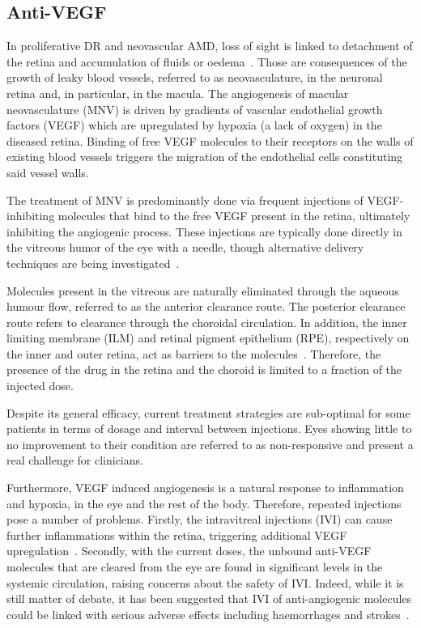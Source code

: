 \documentclass{article}
\begin{document}
\subsection*{Anti-VEGF}

In proliferative DR and neovascular AMD, loss of sight is linked to detachment of the retina and accumulation of fluids or oedema~\cite{Roberts_2020, Waldstein_2016}.
Those are consequences of the growth of leaky blood vessels, referred to as neovasculature, in the neuronal retina and, in particular, in the macula.
The angiogenesis of macular neovasculature (MNV) is driven by gradients of vascular endothelial growth factors (VEGF) which are upregulated by hypoxia (a lack of oxygen) in the diseased retina.
Binding of free VEGF molecules to their receptors on the walls of existing blood vessels triggers the migration of the endothelial cells constituting said vessel walls.

The treatment of MNV is predominantly done via frequent injections of VEGF-inhibiting molecules that bind to the free VEGF present in the retina, ultimately inhibiting the angiogenic process.
These injections are typically done directly in the vitreous humor of the eye with a needle, though alternative delivery techniques are being investigated~\cite{Kim_2021}.

Molecules present in the vitreous are naturally eliminated through the aqueous humour flow, referred to as the anterior clearance route.
The posterior clearance route refers to clearance through the choroidal circulation.
In addition, the inner limiting membrane (ILM) and retinal pigment epithelium (RPE), respectively on the inner and outer retina, act as barriers to the molecules~\cite{Park_2015}.
Therefore, the presence of the drug in the retina and the choroid is limited to a fraction of the injected dose. 

Despite its general efficacy, current treatment strategies are sub-optimal for some patients in terms of dosage and interval between injections.
Eyes showing little to no improvement to their condition are referred to as non-responsive and present a real challenge for clinicians.

Furthermore, VEGF induced angiogenesis is a natural response to inflammation and hypoxia, in the eye and the rest of the body. 
Therefore, repeated injections pose a number of problems.
Firstly, the intravitreal injections (IVI) can cause further inflammations within the retina, triggering additional VEGF upregulation~\cite{Iyer_2022}.
Secondly, with the current doses, the unbound anti-VEGF molecules that are cleared from the eye are found in significant levels in the systemic circulation, raising concerns about the safety of IVI.
Indeed, while it is still matter of debate, it has been suggested that IVI of anti-angiogenic molecules could be linked with serious adverse effects including haemorrhages and strokes~\cite{Avery_2016, Kaiser_2019, Maloney_2021}.
\end{document}
